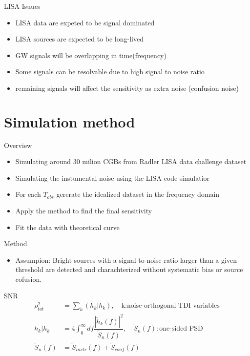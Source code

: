 \documentclass[pdf]{beamer}
\begin{document}
\begin{frame}{LISA Isuues}
\begin{itemize}
\item LISA data are expeted to be signal dominated
\item LISA sources are expected to be long-lived
\item GW signals will be overlapping in time(frequency)
\pause
\item Some signals can be resolvable due to high signal to noise ratio
\pause
\item remaining signals will affect the sensitivity as extra noise (confusion noise)
\end{itemize}
\end{frame}

\section{Simulation method}
\begin{frame}{Overview}
\begin{itemize}
\item Simulating around 30 milion CGBs from Radler LISA data challenge dataset
\item Simulating the instumental noise using the LISA code simulatior
\item For each $T_{obs}$ gererate the idealized dataset in the frequency domain
\item Apply the method to find the final sensitivity
\item Fit the data with theoretical curve
\end{itemize}
\end{frame}

\begin{frame}{Method}
\begin{itemize}
\item Assumpion: Bright sources with a signal-to-noise ratio larger than a given threshold are detected and charachterized without systematic bias or source cofusion.
\end{itemize}
\begin{block}{SNR}
\begin{align*}
\rho^2_{tot} &= \sum_k (h_k|h_k), \quad  \text{k:noise-orthogonal TDI variables} \\
h_k|h_k &= 4 \int_{0}^{\infty} df \dfrac{|\tilde{h}_k(f)|^2}{\tilde{S}_n(f)}, \quad \tilde{S}_n(f):\text{one-sided PSD} \\
\tilde{S}_n(f) &= \tilde{S}_{instr}(f) +\tilde{S}_{conf}(f)
\end{align*}
\end{block}
\end{frame}
\end{document}
